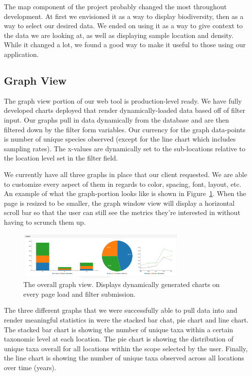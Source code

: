\documentclass[10pt,draftclsnofoot,onecolumn]{IEEEtran}
\begin{document}
The map component of the project probably changed the most throughout development.
At first we envisioned it as a way to display biodiversity, then as a way to select our desired data.
We ended on using it as a way to give context to the data we are looking at, as well as displaying sample location and density.
While it changed a lot, we found a good way to make it useful to those using our application.

\subsection{Graph View} %
The graph view portion of our web tool is production-level ready.
We have fully developed charts deployed that render dynamically-loaded data based off of filter input.
Our graphs pull in data dynamically from the database and are then filtered down by the filter form variables.
Our currency for the graph data-points is number of unique species observed (except for the line chart which includes sampling rates).
The x-values are dynamically set to the sub-locations relative to the location level set in the filter field.

We currently have all three graphs in place that our client requested.
We are able to customize every aspect of them in regards to color, spacing, font, layout, etc.
An example of what the graph-portion looks like is shown in Figure~\ref{fig:graph_view}.
When the page is resized to be smaller, the graph window view will display a horizontal scroll bar so that the user can still see the metrics they’re interested in without having to scrunch them up.

\begin{figure}[h]
\centering
\includegraphics[width=0.75\textwidth]{images/graph_view.jpg}
\captionsetup{justification=centering}
\caption{
  The overall graph view.
  Displays dynamically generated charts on every page load and filter submission.
}
\label{fig:graph_view}
\end{figure}

The three different graphs that we were successfully able to pull data into and render meaningful statistics in were the stacked bar chat, pie chart and line chart.
The stacked bar chart is showing the number of unique taxa within a certain taxonomic level at each location.
The pie chart is showing the distribution of unique taxa overall for all locations within the scope selected by the user.
Finally, the line chart is showing the number of unique taxa observed across all locations over time (years).
\end{document}
